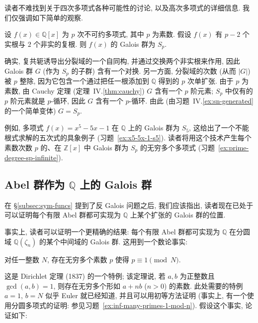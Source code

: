 读者不难找到关于四次多项式各种可能性的讨论, 以及高次多项式的详细信息. 我们仅强调如下简单的观察.

\begin{example}\label{ex:prime-degree-sp}
设 $f(x)\in\mathbb{Q}[x]$ 为 $p$ 次不可约多项式, 其中 $p$ 为素数. 假设 $f(x)$ 有 $p-2$ 个实根与 $2$ 个非实的复根. 则 $f(x)$ 的 Galois 群为 $S_p$.

确实, 复共轭诱导出分裂域的一个自同构, 并通过交换两个非实根来作用, 因此 Galois 群 $G$ (作为 $S_p$ 的子群) 含有一个对换. 另一方面, 分裂域的次数 (从而 $\lvert G\rvert$) 被 $p$ 整除, 因为它包含一个通过把任一根添加到 $\mathbb{Q}$ 得到的 $p$ 次单扩张. 由于 $p$ 为素数, 由 Cauchy 定理 (定理~IV.\ref{thm:cauchy}) $G$ 含有一个 $p$ 阶元素; $S_p$ 中仅有的 $p$ 阶元素就是 $p$-循环, 因此 $G$ 含有一个 $p$-循环. 由此 (由习题~IV.\ref{ex:sn-generated} 的一个简单变体) $G=S_p$.

例如, 多项式 $f(x)=x^5-5x-1$ 在 $\mathbb{Q}$ 上的 Galois 群为 $S_5$, 这给出了一个不能根式求解的五次式的具象例子 (习题~\ref{ex:x5-5x-1-s5}). 读者将用这个技术产生每个素数次数 $p$ 的、在 $\mathbb{Z}[x]$ 中 Galois 群为 $S_p$ 的无穷多个多项式 (习题~\ref{ex:prime-degree-sp-infinite}).
\end{example}

\subsection{Abel 群作为 \texorpdfstring{$\mathbb{Q}$}{Q} 上的 Galois 群}
\label{subsec:abelian-galois-q}

在 §\ref{subsec:sym-funcs} 提到了反 Galois 问题之后, 我们应该指出, 读者现在已处于可以证明每个有限 Abel 群都可实现为 $\mathbb{Q}$ 上某个扩张的 Galois 群的位置.

事实上, 读者可以证明一个更精确的结果: 每个有限 Abel 群都可实现为 $\mathbb{Q}$ 在分圆域 $\mathbb{Q}(\zeta_n)$ 的某个中间域的 Galois 群. 这用到一个数论事实:

对任一整数 $N$, 存在无穷多个素数 $p$ 使得 $p\equiv 1\pmod N$.

这是 Dirichlet 定理 (1837) 的一个特例; 该定理说, 若 $a,b$ 为正整数且 $\gcd(a,b)=1$, 则存在无穷多个形如 $a+nb$ ($n>0$) 的素数. 此处需要的特例 $a=1$, $b=N$ 似乎 Euler 就已经知道, 并且可以用初等方法证明 (事实上, 有一个使用分圆多项式的证明: 参见习题~\ref{ex:inf-many-primes-1-mod-n}). 假设这个事实, 论证如下:

